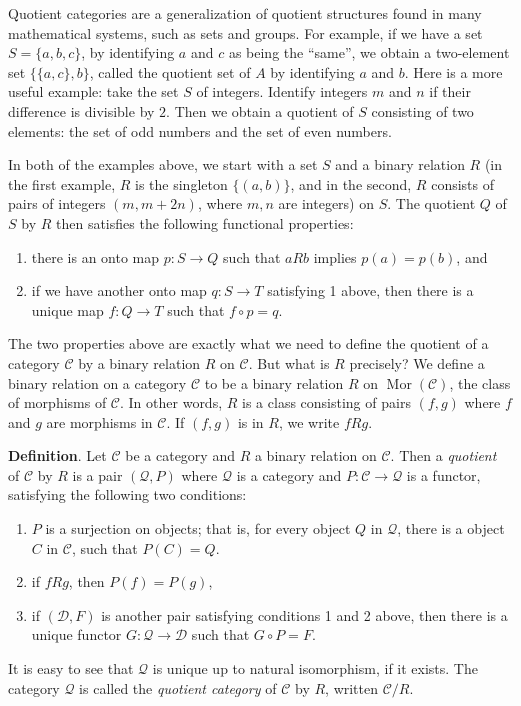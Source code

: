\documentclass[12pt]{article}
\begin{document}
Quotient categories are a generalization of quotient structures found in many mathematical systems, such as sets and groups.  For example, if we have a set $S= \lbrace a,b,c \rbrace$, by identifying $a$ and $c$ as being the ``same'', we obtain a two-element set $\lbrace \lbrace a,c\rbrace ,b\rbrace$, called the quotient set of $A$ by identifying $a$ and $b$.  Here is a more useful example: take the set $S$ of integers.  Identify integers $m$ and $n$ if their difference is divisible by $2$.  Then we obtain a quotient of $S$ consisting of two elements: the set of odd numbers and the set of even numbers.

In both of the examples above, we start with a set $S$ and a binary relation $R$ (in the first example, $R$ is the singleton $\lbrace (a,b)\rbrace$, and in the second, $R$ consists of pairs of integers $(m,m\!+\!2n)$, where $m,n$ are integers) on $S$.  The quotient $Q$ of $S$ by $R$ then satisfies the following functional properties: 
\begin{enumerate}
\item
there is an onto map $p:S\to Q$ such that $aRb$ implies $p(a)=p(b)$, and 
\item
if we have another onto map $q:S\to T$ satisfying 1 above, then there is a unique map $f:Q\to T$ such that $f\circ p=q$.
\end{enumerate}

The two properties above are exactly what we need to define the quotient of a category $\mathcal{C}$ by a binary relation $R$ on $\mathcal{C}$.  But what is $R$ precisely?  We define a binary relation on a category $\mathcal{C}$ to be a binary relation $R$ on $\operatorname{Mor}(\mathcal{C})$, the class of morphisms of $\mathcal{C}$.  In other words, $R$ is a class consisting of pairs $(f,g)$ where $f$ and $g$ are morphisms in $\mathcal{C}$.  If $(f,g)$ is in $R$, we write $fRg$.

\textbf{Definition}.  Let $\mathcal{C}$ be a category and $R$ a binary relation on $\mathcal{C}$.  Then a \emph{quotient} of $\mathcal{C}$ by $R$ is a pair $(\mathcal{Q},P)$ where $\mathcal{Q}$ is a category and $P:\mathcal{C} \to \mathcal{Q}$ is a functor, satisfying the following two conditions:
\begin{enumerate}
\item $P$ is a surjection on objects; that is, for every object $Q$ in $\mathcal{Q}$, there is a object $C$ in $\mathcal{C}$, such that $P(C)=Q$.
\item if $fRg$, then $P(f)=P(g)$,
\item if $(\mathcal{D},F)$ is another pair satisfying conditions 1 and 2 above, then there is a unique functor $G:\mathcal{Q}\to \mathcal{D}$ such that $G\circ P = F$.
\end{enumerate}
It is easy to see that $\mathcal{Q}$ is unique up to natural isomorphism, if it exists.  The category $\mathcal{Q}$ is called the \emph{quotient category} of $\mathcal{C}$ by $R$, written $\mathcal{C}/R$.
\end{document}
